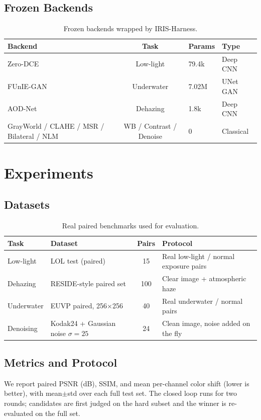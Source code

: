 \documentclass[11pt,letterpaper]{article}
\begin{document}
\subsection{Frozen Backends}
\begin{table}[H]
\centering
\caption{Frozen backends wrapped by IRIS-Harness.}
\label{tab:backends}
\begin{tabular}{lcll}
\toprule
Backend & Task & Params & Type \\
\midrule
Zero-DCE & Low-light & 79.4k & Deep CNN \\
FUnIE-GAN & Underwater & 7.02M & UNet GAN \\
AOD-Net & Dehazing & 1.8k & Deep CNN \\
GrayWorld / CLAHE / MSR / Bilateral / NLM & WB / Contrast / Denoise & 0 & Classical \\
\bottomrule
\end{tabular}
\end{table}

\section{Experiments}
\label{sec:exp}

\subsection{Datasets}
\begin{table}[H]
\centering
\caption{Real paired benchmarks used for evaluation.}
\label{tab:datasets}
\begin{tabular}{llcl}
\toprule
Task & Dataset & Pairs & Protocol \\
\midrule
Low-light & LOL test (paired) & 15 & Real low-light / normal exposure pairs \\
Dehazing & RESIDE-style paired set & 100 & Clear image + atmospheric haze \\
Underwater & EUVP paired, 256$\times$256 & 40 & Real underwater / normal pairs \\
Denoising & Kodak24 + Gaussian noise $\sigma{=}25$ & 24 & Clean image, noise added on the fly \\
\bottomrule
\end{tabular}
\end{table}

\subsection{Metrics and Protocol}
We report paired PSNR (dB), SSIM, and mean per-channel color shift (lower is better), with
mean$\pm$std over each full test set. The closed loop runs for two rounds; candidates are
first judged on the hard subset and the winner is re-evaluated on the full set.
\end{document}
